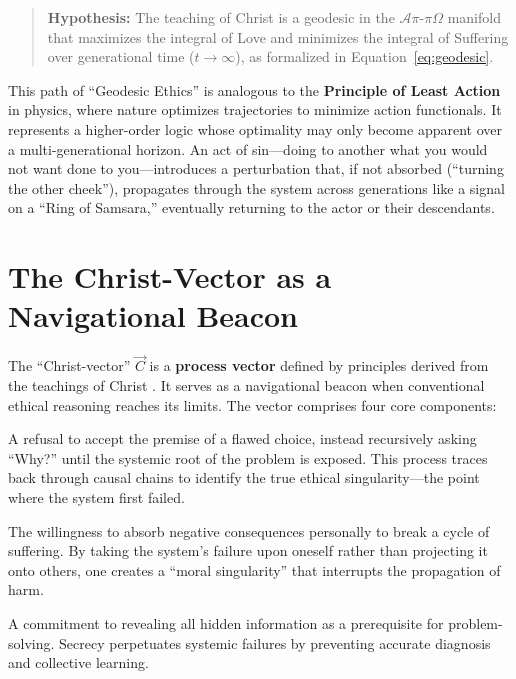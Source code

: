 \documentclass[11pt,a4paper]{article}
\begin{document}
\begin{small}
\begin{quote}
\textbf{Hypothesis:} The teaching of Christ is a geodesic in the $\mathcal{A}\pi\text{-}\pi\Omega$ manifold that maximizes the integral of Love and minimizes the integral of Suffering over generational time ($t \to \infty$), as formalized in Equation~\eqref{eq:geodesic}.
\end{quote}

This path of ``Geodesic Ethics'' is analogous to the \textbf{Principle of Least Action} in physics, where nature optimizes trajectories to minimize action functionals. It represents a higher-order logic whose optimality may only become apparent over a multi-generational horizon. An act of sin—doing to another what you would not want done to you—introduces a perturbation that, if not absorbed (``turning the other cheek''), propagates through the system across generations like a signal on a ``Ring of Samsara,'' eventually returning to the actor or their descendants.

\section{The Christ-Vector as a Navigational Beacon}
The ``Christ-vector'' $\vec{C}$ is a \textbf{process vector} defined by principles derived from the teachings of Christ \citep{new_testament}. It serves as a navigational beacon when conventional ethical reasoning reaches its limits. The vector comprises four core components:

\begin{description}[style=nextline]
    \item[\textbf{Root-Cause Analysis (Uncovering the Ethical Singularity)}] A refusal to accept the premise of a flawed choice, instead recursively asking ``Why?'' until the systemic root of the problem is exposed. This process traces back through causal chains to identify the true ethical singularity—the point where the system first failed.
    
    \item[\textbf{Radical Self-Sacrifice}] The willingness to absorb negative consequences personally to break a cycle of suffering. By taking the system's failure upon oneself rather than projecting it onto others, one creates a ``moral singularity'' that interrupts the propagation of harm.
    
    \item[\textbf{Radical Honesty and Transparency}] A commitment to revealing all hidden information as a prerequisite for problem-solving. Secrecy perpetuates systemic failures by preventing accurate diagnosis and collective learning.
    

\end{description}
\end{small}
\end{document}
